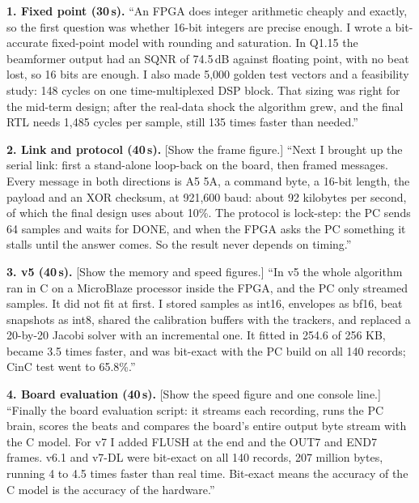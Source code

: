 \documentclass[11pt]{article}
\begin{document}
\begin{simple}
\textbf{1. Fixed point (30\,s).} ``An FPGA does integer arithmetic cheaply and exactly, so the first question was whether 16-bit integers are precise enough. I wrote a bit-accurate fixed-point model with rounding and saturation. In Q1.15 the beamformer output had an SQNR of 74.5\,dB against floating point, with no beat lost, so 16 bits are enough. I also made 5,000 golden test vectors and a feasibility study: 148 cycles on one time-multiplexed DSP block. That sizing was right for the mid-term design; after the real-data shock the algorithm grew, and the final RTL needs 1,485 cycles per sample, still 135 times faster than needed.''

\textbf{2. Link and protocol (40\,s).} [Show the frame figure.] ``Next I brought up the serial link: first a stand-alone loop-back on the board, then framed messages. Every message in both directions is A5 5A, a command byte, a 16-bit length, the payload and an XOR checksum, at 921,600 baud: about 92 kilobytes per second, of which the final design uses about 10\%. The protocol is lock-step: the PC sends 64 samples and waits for DONE, and when the FPGA asks the PC something it stalls until the answer comes. So the result never depends on timing.''

\textbf{3. v5 (40\,s).} [Show the memory and speed figures.] ``In v5 the whole algorithm ran in C on a MicroBlaze processor inside the FPGA, and the PC only streamed samples. It did not fit at first. I stored samples as int16, envelopes as bf16, beat snapshots as int8, shared the calibration buffers with the trackers, and replaced a 20-by-20 Jacobi solver with an incremental one. It fitted in 254.6 of 256 KB, became 3.5 times faster, and was bit-exact with the PC build on all 140 records; CinC test went to 65.8\%.''

\textbf{4. Board evaluation (40\,s).} [Show the speed figure and one console line.] ``Finally the board evaluation script: it streams each recording, runs the PC brain, scores the beats and compares the board's entire output byte stream with the C model. For v7 I added FLUSH at the end and the OUT7 and END7 frames. v6.1 and v7-DL were bit-exact on all 140 records, 207 million bytes, running 4 to 4.5 times faster than real time. Bit-exact means the accuracy of the C model is the accuracy of the hardware.''
\end{simple}
\end{document}
